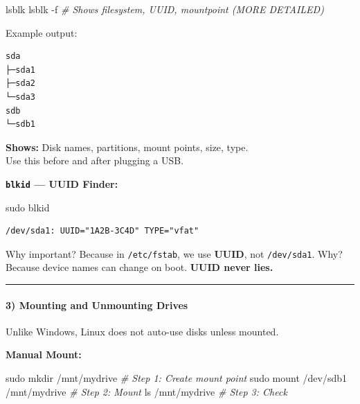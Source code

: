 \documentclass[
  english,
  paper=a4,
  oneside  ,captions=tableheading
]{scrartcl}
\newenvironment{Shaded}{}{}
\newcommand{\AttributeTok}[1]{\textcolor[rgb]{0.49,0.56,0.16}{#1}}
\newcommand{\CommentTok}[1]{\textcolor[rgb]{0.38,0.63,0.69}{\textit{#1}}}
\newcommand{\ExtensionTok}[1]{#1}
\newcommand{\FunctionTok}[1]{\textcolor[rgb]{0.02,0.16,0.49}{#1}}
\newcommand{\NormalTok}[1]{#1}
\begin{document}
\begin{Shaded}
\begin{Highlighting}[]
\ExtensionTok{lsblk}
\ExtensionTok{lsblk} \AttributeTok{{-}f}          \CommentTok{\# Shows filesystem, UUID, mountpoint (MORE DETAILED)}
\end{Highlighting}
\end{Shaded}

Example output:

\begin{verbatim}
sda
├─sda1
├─sda2
└─sda3
sdb
└─sdb1
\end{verbatim}

\textbf{Shows:} Disk names, partitions, mount points, size, type.\\
\faExclamationCircle Use this before and after plugging a USB.

\textbf{\texttt{blkid} --- UUID Finder:}

\begin{Shaded}
\begin{Highlighting}[]
\FunctionTok{sudo}\NormalTok{ blkid}
\end{Highlighting}
\end{Shaded}

\begin{verbatim}
/dev/sda1: UUID="1A2B-3C4D" TYPE="vfat"
\end{verbatim}

Why important? Because in \texttt{/etc/fstab}, we use \textbf{UUID}, not
\texttt{/dev/sda1}. Why? Because device names can change on boot.
\textbf{UUID never lies.}

\begin{center}\rule{0.5\linewidth}{0.5pt}\end{center}

\paragraph{3) Mounting and Unmounting
Drives}\label{mounting-and-unmounting-drives}

Unlike Windows, Linux does not auto-use disks unless mounted.

\textbf{Manual Mount:}

\begin{Shaded}
\begin{Highlighting}[]
\FunctionTok{sudo}\NormalTok{ mkdir /mnt/mydrive           }\CommentTok{\# Step 1: Create mount point}
\FunctionTok{sudo}\NormalTok{ mount /dev/sdb1 /mnt/mydrive }\CommentTok{\# Step 2: Mount}
\FunctionTok{ls}\NormalTok{ /mnt/mydrive                   }\CommentTok{\# Step 3: Check}
\end{Highlighting}
\end{Shaded}
\end{document}

